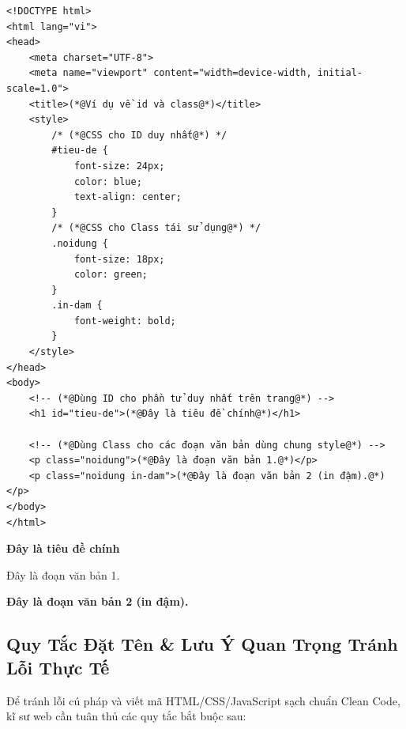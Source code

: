 \begin{codeWindow}
\begin{lstlisting}[language=HTML5]
<!DOCTYPE html>
<html lang="vi">
<head>
    <meta charset="UTF-8">
    <meta name="viewport" content="width=device-width, initial-scale=1.0">
    <title>(*@Ví dụ về id và class@*)</title>
    <style>
        /* (*@CSS cho ID duy nhất@*) */
        #tieu-de {
            font-size: 24px;
            color: blue;
            text-align: center;
        }
        /* (*@CSS cho Class tái sử dụng@*) */
        .noidung {
            font-size: 18px;
            color: green;
        }
        .in-dam {
            font-weight: bold;
        }
    </style>
</head>
<body>
    <!-- (*@Dùng ID cho phần tử duy nhất trên trang@*) -->
    <h1 id="tieu-de">(*@Đây là tiêu đề chính@*)</h1>

    <!-- (*@Dùng Class cho các đoạn văn bản dùng chung style@*) -->
    <p class="noidung">(*@Đây là đoạn văn bản 1.@*)</p>
    <p class="noidung in-dam">(*@Đây là đoạn văn bản 2 (in đậm).@*)</p>
</body>
</html>
\end{lstlisting}
\end{codeWindow}

\begin{browserWindow}
\centering\sffamily
{\Large\bfseries\color{blue} Đây là tiêu đề chính} \par\vspace{6pt}
{\small\color{green} Đây là đoạn văn bản 1.} \par\vspace{4pt}
{\small\bfseries\color{green} Đây là đoạn văn bản 2 (in đậm).}
\end{browserWindow}

\subsection{Quy Tắc Đặt Tên \& Lưu Ý Quan Trọng Tránh Lỗi Thực Tế}

Để tránh lỗi cú pháp và viết mã HTML/CSS/JavaScript sạch chuẩn Clean Code, kĩ sư web cần tuân thủ các quy tắc bắt buộc sau:

